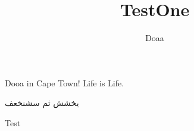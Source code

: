 \documentclass[10pt,a4paper]{aimsessay}
\author{Doaa}
\title{TestOne}
\begin{document}

\maketitle
Dooa in Cape Town! Life is Life.

\begin{otherlanguage}{arabic}
يخشش ثم سشنخعف
\end{otherlanguage}

Test
\end{document}
